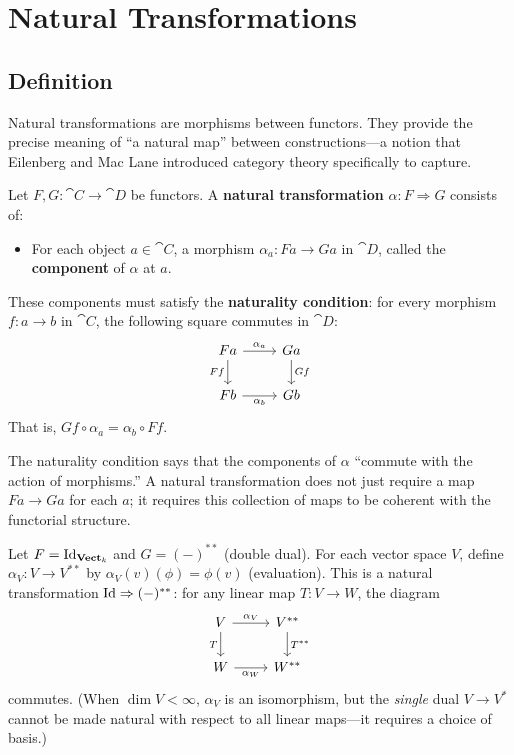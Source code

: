 \chapter{Natural Transformations}
\label{ch:nattrans}

\section{Definition}

Natural transformations are morphisms between functors. They provide the precise meaning of ``a natural map'' between constructions—a notion that Eilenberg and Mac Lane introduced category theory specifically to capture.

\begin{definition}
Let $F, G: \cat{C} \to \cat{D}$ be functors. A \textbf{natural transformation} $\alpha: F \Rightarrow G$ consists of:
\begin{itemize}
  \item For each object $a \in \cat{C}$, a morphism $\alpha_a: Fa \to Ga$ in $\cat{D}$, called the \textbf{component} of $\alpha$ at $a$.
\end{itemize}
These components must satisfy the \textbf{naturality condition}: for every morphism $f: a \to b$ in $\cat{C}$, the following square commutes in $\cat{D}$:
\[
  \begin{tikzcd}
    Fa \arrow[r, "\alpha_a"] \arrow[d, "Ff"'] & Ga \arrow[d, "Gf"] \\
    Fb \arrow[r, "\alpha_b"'] & Gb
  \end{tikzcd}
\]
That is, $Gf \circ \alpha_a = \alpha_b \circ Ff$.
\end{definition}

\begin{remark}
The naturality condition says that the components of $\alpha$ ``commute with the action of morphisms.'' A natural transformation does not just require a map $Fa \to Ga$ for each $a$; it requires this collection of maps to be coherent with the functorial structure.
\end{remark}

\begin{example}
Let $F = \mathrm{Id}_{\mathbf{Vect}_k}$ and $G = (-)^{**}$ (double dual). For each vector space $V$, define $\alpha_V: V \to V^{**}$ by $\alpha_V(v)(\phi) = \phi(v)$ (evaluation). This is a natural transformation $\mathrm{Id} \Rightarrow (-)^{**}$: for any linear map $T: V \to W$, the diagram
\[
  \begin{tikzcd}
    V \arrow[r, "\alpha_V"] \arrow[d, "T"'] & V^{**} \arrow[d, "T^{**}"] \\
    W \arrow[r, "\alpha_W"'] & W^{**}
  \end{tikzcd}
\]
commutes. (When $\dim V < \infty$, $\alpha_V$ is an isomorphism, but the \emph{single} dual $V \to V^*$ cannot be made natural with respect to all linear maps—it requires a choice of basis.)
\end{example}

